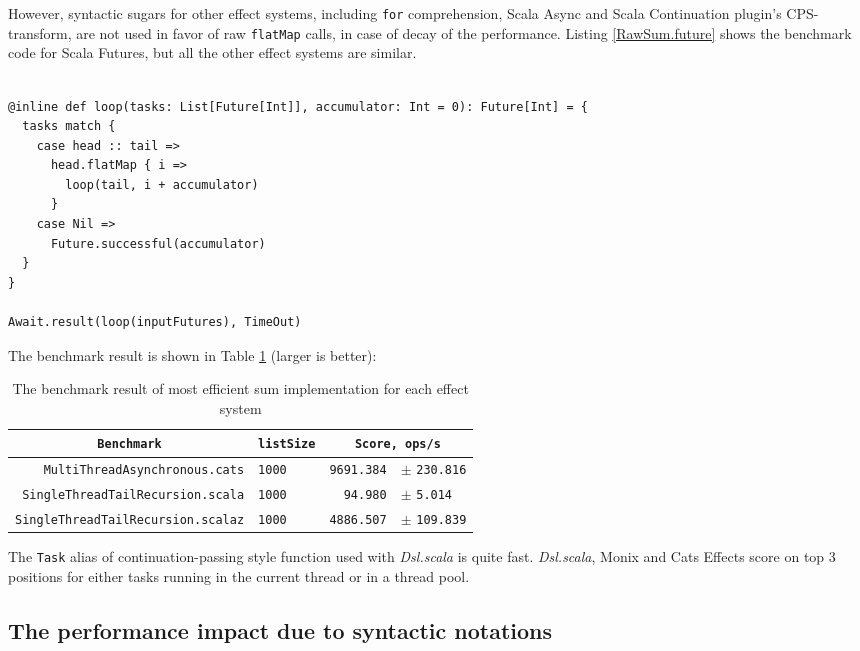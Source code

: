 However, syntactic sugars for other effect systems, including \lstinline{for} comprehension, Scala Async and Scala Continuation plugin's CPS-transform, are not used in favor of raw \lstinline{flatMap} calls, in case of decay of the performance. Listing \ref{RawSum.future} shows the benchmark code for Scala Futures, but all the other effect systems are similar.

\begin{lstlisting}[caption={The most efficient implementation of sum based on Scala Futures},label={RawSum.future}]

@inline def loop(tasks: List[Future[Int]], accumulator: Int = 0): Future[Int] = {
  tasks match {
    case head :: tail =>
      head.flatMap { i =>
        loop(tail, i + accumulator)
      }
    case Nil =>
      Future.successful(accumulator)
  }
}

Await.result(loop(inputFutures), TimeOut)
\end{lstlisting}

The benchmark result is shown in Table \ref{RawSum} (larger is better):

\begin{table}[htbp]
  \begin{tabular}{r|l|rl}
    \multicolumn{1}{c|}{\texttt{Benchmark}} & \texttt{listSize} & \multicolumn{2}{c}{\texttt{Score, ops/s}} \\
   \hline
   \texttt{MultiThreadAsynchronous.cats} & \texttt{1000} & \texttt{9691.384} & \scriptsize $\pm$ \texttt{230.816}  \\
   \texttt{SingleThreadTailRecursion.scala} & \texttt{1000} & \texttt{94.980} & \scriptsize $\pm$ \texttt{5.014}  \\
   \texttt{SingleThreadTailRecursion.scalaz} & \texttt{1000} & \texttt{4886.507} & \scriptsize $\pm$ \texttt{109.839}  \\
  \end{tabular}
  \caption{The benchmark result of most efficient sum implementation for each effect system}
  \label{RawSum}
\end{table}

The \lstinline{Task} alias of continuation-passing style function used with \textit{Dsl.scala} is quite fast. \textit{Dsl.scala}, Monix and Cats Effects score on top 3 positions for either tasks running in the current thread or in a thread pool.

\subsection{The performance impact due to syntactic notations}

